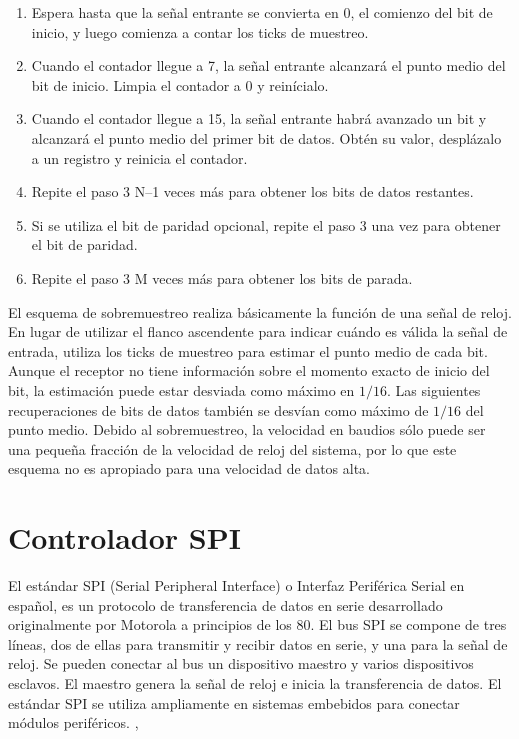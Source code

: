     \begin{enumerate}
      \item Espera hasta que la señal entrante se convierta en 0, el comienzo del bit de inicio, y luego comienza a contar los ticks de muestreo.
      \item Cuando el contador llegue a 7, la señal entrante alcanzará el punto medio del bit de inicio. Limpia el contador a 0 y reinícialo.
      \item Cuando el contador llegue a 15, la señal entrante habrá avanzado un bit y alcanzará el punto medio del primer bit de datos. Obtén su valor, desplázalo a un registro y reinicia el contador.
      \item Repite el paso 3 N–1 veces más para obtener los bits de datos restantes.
      \item Si se utiliza el bit de paridad opcional, repite el paso 3 una vez para obtener el bit de paridad.
      \item Repite el paso 3 M veces más para obtener los bits de parada.
    \end{enumerate}

    El esquema de sobremuestreo realiza básicamente la función de una señal de reloj. En lugar de utilizar el flanco ascendente para indicar cuándo es válida la señal de entrada, utiliza los ticks de muestreo para estimar el punto medio de cada bit. Aunque el receptor no tiene información sobre el momento exacto de inicio del bit, la estimación puede estar desviada como máximo en $1/16$. Las siguientes recuperaciones de bits de datos también se desvían como máximo de $1/16$ del punto medio. Debido al sobremuestreo, la velocidad en baudios sólo puede ser una pequeña fracción de la velocidad de reloj del sistema, por lo que este esquema no es apropiado para una velocidad de datos alta.

	\section{Controlador SPI}

    El estándar SPI (Serial Peripheral Interface) o Interfaz Periférica Serial en español, es un protocolo de transferencia de datos en serie desarrollado originalmente por Motorola a principios de los 80. El bus SPI se compone de tres líneas, dos de ellas para transmitir y recibir datos en serie, y una para la señal de reloj. Se pueden conectar al bus un dispositivo maestro y varios dispositivos esclavos. El maestro genera la señal de reloj e inicia la transferencia de datos. El estándar SPI se utiliza ampliamente en sistemas embebidos para conectar módulos periféricos. \cite{Chu2018}, \cite{Chu2008}

